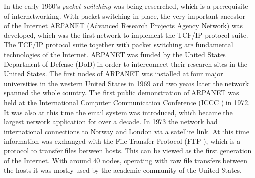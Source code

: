 \documentclass[a4paper,11pt]{kth-mag}
\newcommand\abbr[2][]{\uppercase{#2}\ifthenelse{\equal{#1}{}}%
                     {}{#1}}
\begin{document}
        In the early 1960's \emph{packet switching} was being researched, which is a prerequisite of internetworking.
        With packet switching in place, the very important ancestor of the Internet \abbr{arpanet} (Advanced Research Projects Agency Network) was developed, which was the first network to implement the \abbr{tcp/ip} protocol suite.
        The \abbr{tcp/ip} protocol suite together with packet switching are fundamental technologies of the Internet.
        \abbr{arpanet} was funded by the United States Department of Defense (DoD) in order to interconnect their research sites in the United States.
        The first nodes of \abbr{arpanet} was installed at four major universities in the western United States in 1969 and two years later the network spanned the whole country. 
        The first public demonstration of \abbr{arpanet} was held at the International Computer Communication Conference (\abbr{iccc}) in 1972.
        It was also at this time the email system was introduced, which became the largest network application for over a decade.
        In 1973 the network had international connections to Norway and London via a satellite link.
        At this time information was exchanged with the File Transfer Protocol (\abbr{ftp}), which is a protocol to transfer files between hosts.
        This can be viewed as the first generation of the Internet. With around 40 nodes, operating with raw file transfers between the hosts it was mostly used by the academic community of the United States.
\end{document}
